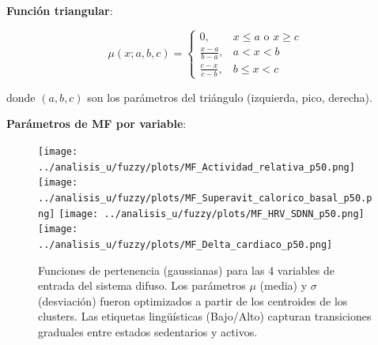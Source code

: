 \documentclass[12pt,letterpaper,twoside]{report}
\begin{document}
\begin{calculobox}
\textbf{Función triangular}:

\begin{equation}
\mu(x; a, b, c) = 
\begin{cases}
0, & x \leq a \text{ o } x \geq c \\
\frac{x-a}{b-a}, & a < x < b \\
\frac{c-x}{c-b}, & b \leq x < c
\end{cases}
\end{equation}

donde $(a, b, c)$ son los parámetros del triángulo (izquierda, pico, derecha).

\textbf{Parámetros de MF por variable}:

\begin{table}[H]
\centering
\caption{Parámetros de Funciones de Pertenencia (Percentiles)}
\label{tab:mf_params}
\end{table}
\end{calculobox}

\begin{figure}[htbp]
\centering
\texttt{[image: ../analisis\_u/fuzzy/plots/MF\_Actividad\_relativa\_p50.png]}
\texttt{[image: ../analisis\_u/fuzzy/plots/MF\_Superavit\_calorico\_basal\_p50.png]}
\texttt{[image: ../analisis\_u/fuzzy/plots/MF\_HRV\_SDNN\_p50.png]}
\texttt{[image: ../analisis\_u/fuzzy/plots/MF\_Delta\_cardiaco\_p50.png]}
\caption{Funciones de pertenencia (gaussianas) para las 4 variables de entrada del sistema difuso. Los parámetros $\mu$ (media) y $\sigma$ (desviación) fueron optimizados a partir de los centroides de los clusters. Las etiquetas lingüísticas (Bajo/Alto) capturan transiciones graduales entre estados sedentarios y activos.}
\label{fig:membership_functions}
\end{figure}
\end{document}
